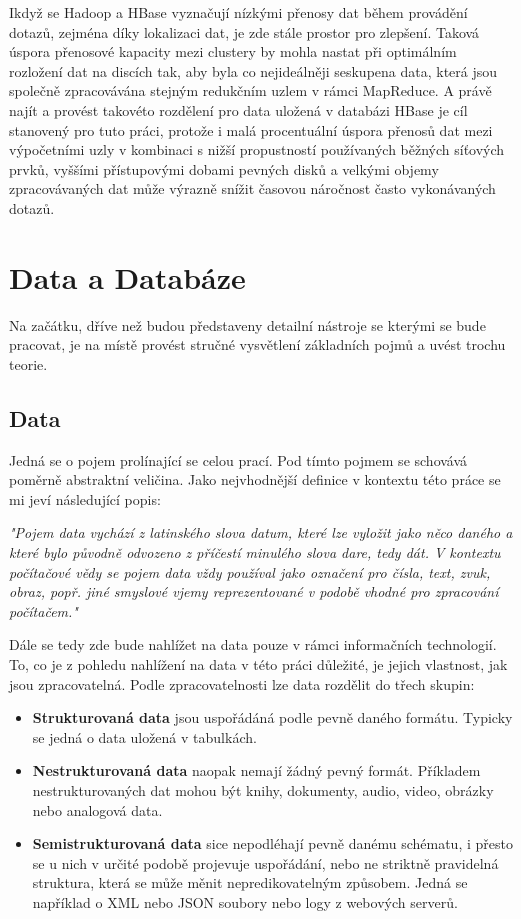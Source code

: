 \documentclass[thesis=M,czech]{FITthesis}[2012/06/26]
\begin{document}
\begin{introduction}
Ikdyž se Hadoop a HBase vyznačují nízkými přenosy dat během provádění dotazů, zejména díky lokalizaci dat, je zde stále prostor pro zlepšení. Taková úspora přenosové kapacity mezi clustery by mohla nastat při optimálním rozložení dat na discích tak, aby byla co nejideálněji seskupena data, která jsou společně zpracovávána stejným redukčním uzlem v rámci MapReduce. A právě najít a provést takovéto rozdělení pro data uložená v databázi HBase je cíl stanovený pro tuto práci, protože i malá procentuální úspora přenosů dat mezi výpočetními uzly v kombinaci s nižší propustností používaných běžných síťových prvků, vyššími přístupovými dobami pevných disků a velkými objemy zpracovávaných dat může výrazně snížit časovou náročnost často vykonávaných dotazů. 


\end{introduction}
\chapter{Data a Databáze}
Na začátku, dříve než budou představeny detailní nástroje se kterými se bude pracovat, je na místě provést stručné vysvětlení základních pojmů a uvést trochu teorie. 
\section{Data}
Jedná se o pojem prolínající se celou prací. Pod tímto pojmem se schovává poměrně abstraktní veličina. Jako nejvhodnější definice v kontextu této práce se mi jeví následující popis:

\medskip
\textit{"Pojem data vychází z latinského slova datum, které lze vyložit jako něco daného a které
bylo původně odvozeno z příčestí minulého slova dare, tedy dát. V kontextu počítačové
vědy se pojem data vždy používal jako označení pro čísla, text, zvuk, obraz, popř. jiné
smyslové vjemy reprezentované v podobě vhodné pro zpracování počítačem."} \cite{data}
\medskip

Dále se tedy zde bude nahlížet na data pouze v rámci informačních technologií. To, co je z pohledu nahlížení na data v této práci důležité, je jejich vlastnost, jak jsou zpracovatelná. Podle zpracovatelnosti lze data rozdělit do třech skupin:
\begin{itemize}
\item \textbf{Strukturovaná data} jsou uspořádáná podle pevně daného formátu. Typicky se jedná o data uložená v tabulkách.

\item \textbf{Nestrukturovaná data} naopak nemají žádný pevný formát. Příkladem nestrukturovaných dat mohou být knihy, dokumenty, audio, video, obrázky nebo analogová data.

\item \textbf{Semistrukturovaná data} sice nepodléhají pevně danému schématu, i přesto se u nich v určité podobě projevuje uspořádání, nebo ne striktně pravidelná struktura, která se může měnit nepredikovatelným způsobem. Jedná se například o XML nebo JSON soubory nebo logy z webových serverů.
\end{itemize}
 
\end{document}
